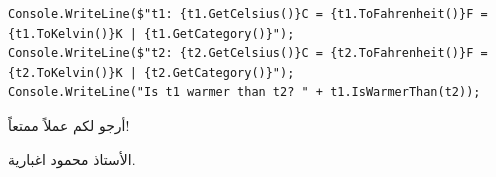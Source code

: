 \documentclass[14pt]{extarticle}
\begin{document}
\begin{enumerate}[itemsep=2em]
{\begin{boxSolution}
\begin{english}
\begin{verbatim}
Console.WriteLine($"t1: {t1.GetCelsius()}C = {t1.ToFahrenheit()}F = {t1.ToKelvin()}K | {t1.GetCategory()}");
Console.WriteLine($"t2: {t2.GetCelsius()}C = {t2.ToFahrenheit()}F = {t2.ToKelvin()}K | {t2.GetCategory()}");
Console.WriteLine("Is t1 warmer than t2? " + t1.IsWarmerThan(t2));
\end{verbatim}
\end{english}
\end{boxSolution}
}
\fi

\end{enumerate}

\vspace{1cm}
\begin{flushleft}
أرجو لكم عملاً ممتعاً!

الأستاذ محمود اغبارية.
\end{flushleft}
\end{document}
